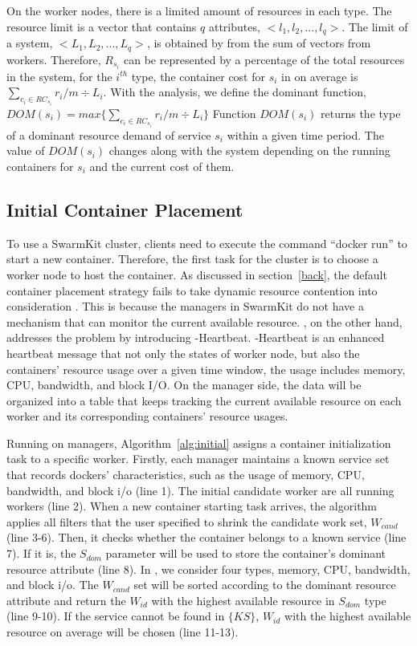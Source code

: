 On the worker nodes, there is a limited amount of resources in each type.
The resource limit is a vector that contains $q$ attributes, $<l_1, l_2, ..., l_q>$.
The limit of a system, $<L_1, L_2, ..., L_q>$, is obtained by from the sum of vectors from workers.
Therefore,  $R_{s_i}$ can be represented by a percentage of the total resources in the system, for the
$i^{th}$ type, the container cost for $s_i$ in on average is $\sum_{c_i \in RC_{s_i}} r_i / m \div L_i$.
With the analysis, we define the dominant function, 
$
  DOM(s_i) = max \{ \sum_{c_i \in RC_{s_i}} r_i / m \div L_i \}
$
Function $DOM(s_i)$ returns the type of a dominant resource demand of service $s_i$ within a given time period.
 The value of $DOM(s_i)$ changes along with the
system depending on the running containers for $s_i$ and the current cost of them.


\subsection{Initial Container Placement}
To use a SwarmKit cluster, clients need to execute the command ``docker run'' to start a new container.
Therefore, the first task for the cluster is to choose a worker node to host the container.
As discussed in section~\ref{back}, the default container placement strategy fails to take dynamic
resource contention into consideration . This is because the managers in SwarmKit
do not have a mechanism that can monitor the current available resource.
\sol, on the other hand, addresses the problem by introducing \sol-Heartbeat.
\sol-Heartbeat is an enhanced heartbeat message that not only the states of worker node, but also the
containers' resource usage over a given time window, the usage includes memory, CPU, bandwidth, and block I/O.
On the manager side, the data will be organized into a table that keeps tracking the current available resource
on each worker and its corresponding containers' resource usages.

Running on managers, Algorithm~\ref{alg:initial} assigns a container initialization task to a specific worker.
Firstly, each manager maintains a known service set that records dockers' characteristics, such as the usage of memory, CPU, bandwidth, and block i/o (line 1).
The initial candidate worker are all running workers (line 2).
When a new container starting task arrives, the algorithm applies all filters that the user specified to shrink the candidate work set, $W_{cand}$ (line 3-6).
Then, it checks whether the container belongs to a known service (line 7). If it is, the $S_{dom}$ parameter will be used to store the container's dominant
resource attribute (line 8). In \sol, we consider four types, memory, CPU, bandwidth, and block i/o.
The $W_{cand}$ set will be sorted according to the dominant resource attribute and
return the $W_{id}$ with the highest available resource in $S_{dom}$ type (line 9-10).
If the service cannot be found in $\{KS\}$, $W_{id}$ with the highest available resource on average will be chosen (line 11-13).

